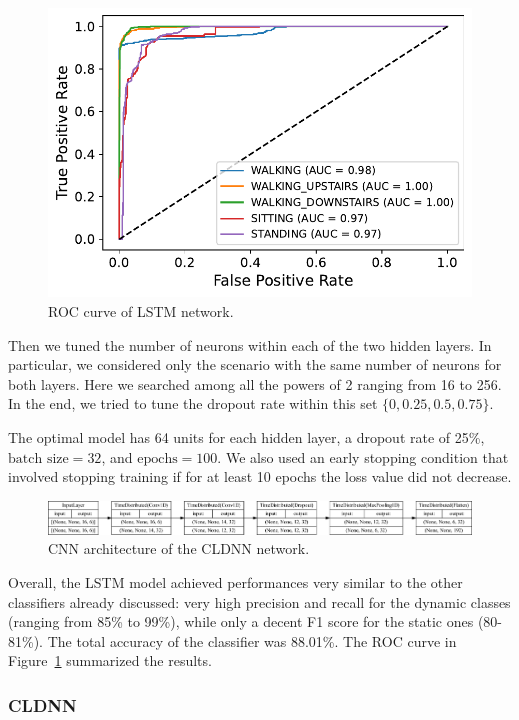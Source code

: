 \documentclass[10pt, a4paper, twocolumn]{article}
\begin{document}
\begin{figure}[t]
    \centering
    \centering
    \includegraphics[width=0.6\linewidth]{immagini simone/output_258_0}
    \caption{ROC curve of LSTM network.}
    \label{fig:lstm_roc}
\end{figure}

Then we tuned the number of neurons within each of the two hidden layers. In particular, we considered only the scenario with the same number of neurons for both layers.  Here we searched among all the powers of 2 ranging from 16 to 256.
In the end, we tried to tune the dropout rate within this set $\{0, 0.25, 0.5, 0.75\}$.

The optimal model has 64 units for each hidden layer, a dropout rate of 25\%, $\text{batch size} = 32$, and $\text{epochs} = 100$. We also used an early stopping condition that involved stopping training if for at least 10 epochs the loss value did not decrease.

\begin{figure}[t]
    \centering
    \includegraphics[width=\textwidth]{immagini simone/cnn_lstm_clf_cnn_part.pdf}
    \caption{CNN architecture of the CLDNN network.}
    \label{fig:CLDNN architecture}
\end{figure}

Overall, the LSTM model achieved performances very similar to the other classifiers already discussed: very high precision and recall for the dynamic classes (ranging from 85\% to 99\%), while only a decent F1 score for the static ones (80-81\%). The total accuracy of the classifier was 88.01\%. The ROC curve in Figure~\ref{fig:lstm_roc} summarized the results. 

\subsubsection*{CLDNN}
\end{document}
